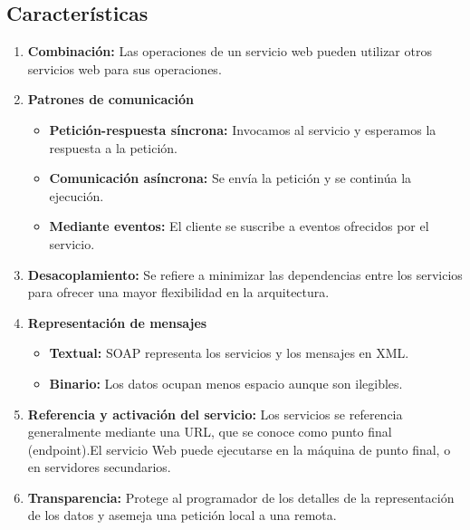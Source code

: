 \subsection{Características}
\begin{enumerate}
\item \textbf{Combinación:} Las operaciones de un servicio web pueden utilizar otros servicios web para sus operaciones.
\item \textbf{Patrones de comunicación}
  \begin{itemize}
  	\item \textbf{Petición-respuesta síncrona:} Invocamos al servicio y esperamos la respuesta a la petición.
    \item \textbf{Comunicación asíncrona:} Se envía la petición y se continúa la ejecución.
    \item \textbf{Mediante eventos:} El cliente se suscribe a eventos ofrecidos por el servicio.
  \end{itemize}
\item \textbf{Desacoplamiento:} Se refiere a minimizar las dependencias entre los servicios para ofrecer una mayor flexibilidad en la arquitectura.
\item \textbf{Representación de mensajes}
  \begin{itemize}
  	\item \textbf{Textual:} SOAP representa los servicios y los mensajes en XML.
    \item \textbf{Binario:} Los datos ocupan menos espacio aunque son ilegibles.
  \end{itemize}
\item \textbf{Referencia y activación del servicio:} Los servicios se referencia generalmente mediante una URL, que se conoce como punto final (endpoint).El servicio Web puede ejecutarse en la máquina de punto final, o en servidores secundarios.
\item \textbf{Transparencia:} Protege al programador de los detalles de la representación
de los datos y asemeja una petición local a una remota.
\end{enumerate}
